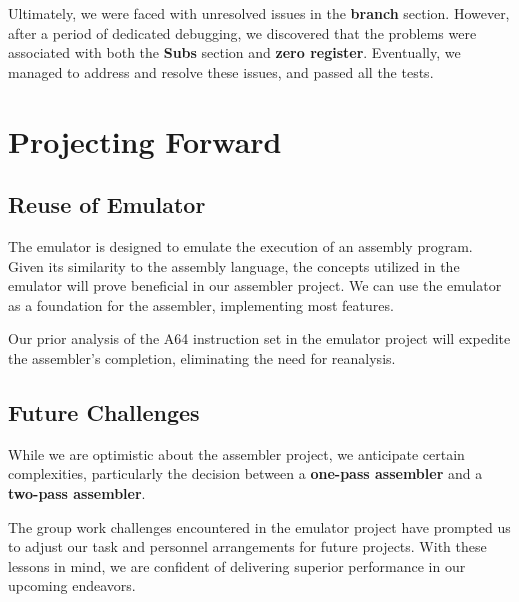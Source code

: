 \documentclass[11pt]{article}
\begin{document}
Ultimately, we were faced with unresolved issues in the \textbf{branch} section. However, after a period of dedicated debugging, we discovered that the problems were associated with both the \textbf{Subs} section and \textbf{zero register}. Eventually, we managed to address and resolve these issues, and passed all the tests.

\section*{Projecting Forward}

\subsection*{Reuse of Emulator}

The emulator is designed to emulate the execution of an assembly program. Given its similarity to the assembly language, the concepts utilized in the emulator will prove beneficial in our assembler project. We can use the emulator as a foundation for the assembler, implementing most features.

Our prior analysis of the A64 instruction set in the emulator project will expedite the assembler's completion, eliminating the need for reanalysis.

\subsection*{Future Challenges}

While we are optimistic about the assembler project, we anticipate certain complexities, particularly the decision between a \textbf{one-pass assembler} and a \textbf{two-pass assembler}.

The group work challenges encountered in the emulator project have prompted us to adjust our task and personnel arrangements for future projects. With these lessons in mind, we are confident of delivering superior performance in our upcoming endeavors.
\end{document}
